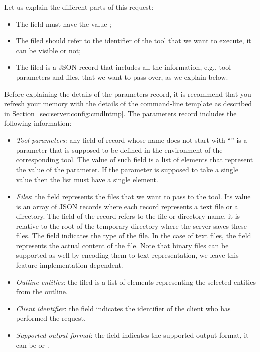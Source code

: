 \bigskip
\noindent
Let us explain the different parts of this request: 
%
\begin{itemize}
%
\item The field  must have the value ;
%
\item The filed  should refer to the identifier
  of the tool that we want to execute, it can be visible or not;
%
\item The filed  is a JSON record that
  includes all the information, e.g., tool parameters and files, that
  we want to pass over, as we explain below.
\end{itemize}
%
Before explaining the details of the parameters record, it is
recommend that you refresh your memory with the details of the
command-line template as described in
Section~\ref{sec:server:config:cmdlntmp}. The parameters record
includes the following information:
%
\begin{itemize}
%
\item \emph{Tool parameters:} any field of record whose name does not
  start with ``'' is a parameter that is supposed
  to be defined in the  environment
  of the corresponding tool. The value of such field is a list of
  elements that represent the value of the parameter. If the parameter
  is supposed to take a single value then the list must have a single
  element.
%
\item \emph{Files}: the field  represents
  the files that we want to pass to the tool. Its value is an array of
  JSON records where each record represents a text file or a
  directory. 
  The  field of the record refers to the file or
  directory name, it is relative to the root of the temporary
  directory where the server saves these files. 
  The  field indicates the type of the file. In the
  case of text files, the field  represents the
  actual content of the file. Note that binary files can be supported
  as well by encoding them to text representation, we leave this
  feature implementation dependent.
%
\item \emph{Outline entities}: the filed 
  is a list of elements representing the selected entities from the
  outline.
%
\item \emph{Client identifier}: the field
   indicates the identifier of the client
  who has performed the request.
%
\item \emph{Supported output format}: the field
   indicates the supported output
  format, it can be  or .
\end{itemize}



